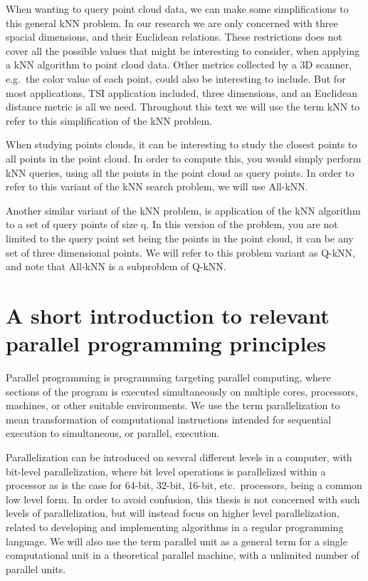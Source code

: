 When wanting to query point cloud data, we can make some simplifications to this general kNN problem. In our research we are only concerned with three spacial dimensions, and their Euclidean relations. These restrictions does not cover all the possible values that might be interesting to consider, when applying a kNN algorithm to point cloud data. Other metrics collected by a 3D scanner, e.g.\ the color value of each point, could also be interesting to include. But for most applications, TSI application included, three dimensions, and an Euclidean distance metric is all we need. Throughout this text we will use the term kNN to refer to this simplification of the kNN problem.

When studying points clouds, it can be interesting to study the closest points to all points in the point cloud. In order to compute this, you would simply perform kNN queries, using all the points in the point cloud as query points. In order to refer to this variant of the kNN search problem, we will use All-kNN\@.

Another similar variant of the kNN problem, is application of the kNN algorithm to a set of query points of size q. In this version of the problem, you are not limited to the query point set being the points in the point cloud, it can be any set of three dimensional points. We will refer to this problem variant as Q-kNN, and note that All-kNN is a subproblem of Q-kNN\@.

\section{A short introduction to relevant parallel programming principles} %
\label{sub:a_short_introduction_to_relevant_parallel_programming_principles}

Parallel programming is programming targeting parallel computing, where sections of the program is executed simultaneously on multiple cores, processors, machines, or other suitable environments. We use the term parallelization to mean transformation of computational instructions intended for sequential execution to simultaneous, or parallel, execution.

Parallelization can be introduced on several different levels in a computer, with bit-level parallelization, where bit level operations is parallelized within a processor as is the case for 64-bit, 32-bit, 16-bit, etc.\ processors, being a common low level form. In order to avoid confusion, this thesis is not concerned with such levels of parallelization, but will instead focus on higher level parallelization, related to developing and implementing algorithms in a regular programming language. We will also use the term parallel unit as a general term for a single computational unit in a theoretical parallel machine, with a unlimited number of parallel units.

